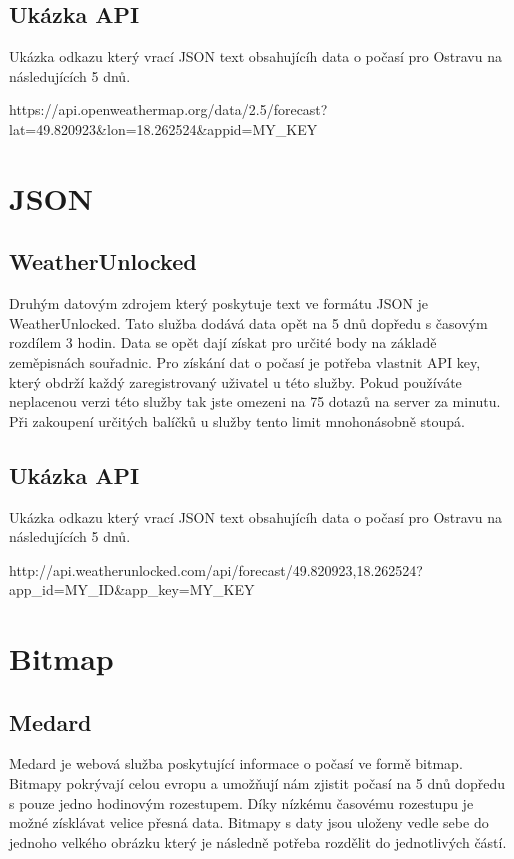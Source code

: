 \documentclass[czech,bachelor,dept460,male,csharp,cpdeclaration]{diploma}
\begin{document}
	\subsection{Ukázka API}
	
	Ukázka odkazu který vrací JSON text obsahujícíh data o počasí pro Ostravu na následujících 5 dnů.
	
	https://api.openweathermap.org/data/2.5/forecast?lat=49.820923\&lon=18.262524\&appid=MY\_KEY
	
	\section{JSON}
	\subsection{WeatherUnlocked}
	
	Druhým datovým zdrojem který poskytuje text ve formátu JSON je WeatherUnlocked. Tato služba dodává data opět na 5 dnů dopředu s časovým rozdílem 3 hodin. Data se opět dají získat pro určité body na základě zeměpisnách souřadnic. Pro získání dat o počasí je potřeba vlastnit API key, který obdrží každý zaregistrovaný uživatel u této služby. Pokud používáte neplacenou verzi této služby tak jste omezeni na 75 dotazů na server za minutu. Při zakoupení určitých balíčků u služby tento limit mnohonásobně stoupá.
	
	\subsection{Ukázka API}
	
	Ukázka odkazu který vrací JSON text obsahujícíh data o počasí pro Ostravu na následujících 5 dnů.
	
	http://api.weatherunlocked.com/api/forecast/49.820923,18.262524?app\_id=MY\_ID\&app\_key=MY\_KEY
	
	\section{Bitmap}
	\subsection{Medard}
	
	Medard je webová služba poskytující informace o počasí ve formě bitmap. Bitmapy pokrývají celou evropu a umožňují nám zjistit počasí na 5 dnů dopředu s pouze jedno hodinovým rozestupem. Díky nízkému časovému rozestupu je možné získlávat velice přesná data. Bitmapy s daty jsou uloženy vedle sebe do jednoho velkého obrázku který je následně potřeba rozdělit do jednotlivých částí.
	
\end{document}
